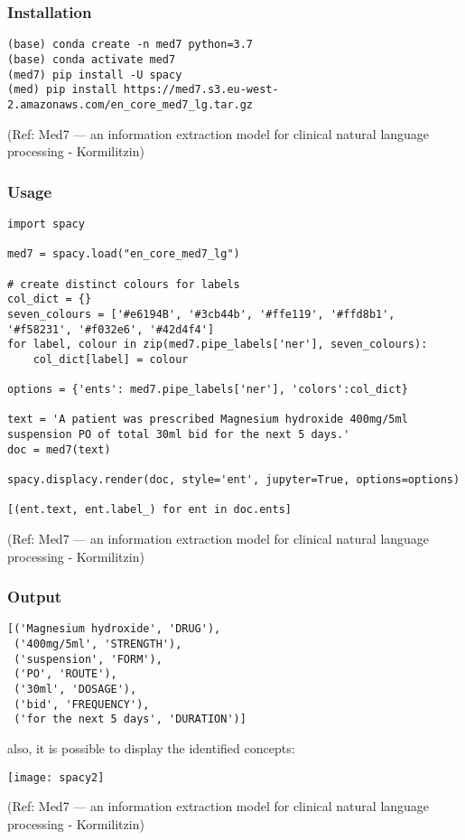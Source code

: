 \begin{frame}[fragile]\frametitle{Installation}


\begin{lstlisting}
(base) conda create -n med7 python=3.7
(base) conda activate med7
(med7) pip install -U spacy
(med) pip install https://med7.s3.eu-west-2.amazonaws.com/en_core_med7_lg.tar.gz

\end{lstlisting}

	{\tiny (Ref: Med7 — an information extraction model for clinical natural language processing - Kormilitzin)}

\end{frame}

\begin{frame}[fragile]\frametitle{Usage}


\begin{lstlisting}
import spacy

med7 = spacy.load("en_core_med7_lg")

# create distinct colours for labels
col_dict = {}
seven_colours = ['#e6194B', '#3cb44b', '#ffe119', '#ffd8b1', '#f58231', '#f032e6', '#42d4f4']
for label, colour in zip(med7.pipe_labels['ner'], seven_colours):
    col_dict[label] = colour

options = {'ents': med7.pipe_labels['ner'], 'colors':col_dict}

text = 'A patient was prescribed Magnesium hydroxide 400mg/5ml suspension PO of total 30ml bid for the next 5 days.'
doc = med7(text)

spacy.displacy.render(doc, style='ent', jupyter=True, options=options)

[(ent.text, ent.label_) for ent in doc.ents]
\end{lstlisting}

	{\tiny (Ref: Med7 — an information extraction model for clinical natural language processing - Kormilitzin)}

\end{frame}

\begin{frame}[fragile]\frametitle{Output}


\begin{lstlisting}
[('Magnesium hydroxide', 'DRUG'),
 ('400mg/5ml', 'STRENGTH'),
 ('suspension', 'FORM'),
 ('PO', 'ROUTE'),
 ('30ml', 'DOSAGE'),
 ('bid', 'FREQUENCY'),
 ('for the next 5 days', 'DURATION')]
\end{lstlisting}

also, it is possible to display the identified concepts:

\begin{center}
\texttt{[image: spacy2]}
\end{center}

	{\tiny (Ref: Med7 — an information extraction model for clinical natural language processing - Kormilitzin)}

\end{frame}